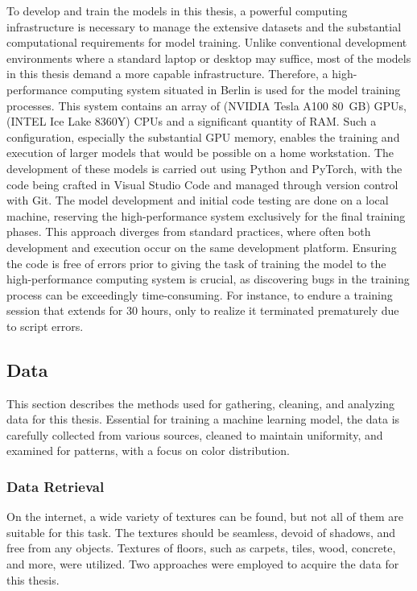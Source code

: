 To develop and train the models in this thesis, a powerful computing infrastructure is necessary to manage the extensive datasets and the substantial computational requirements for model training. Unlike conventional development environments where a standard laptop or desktop may suffice, most of the models in this thesis demand a more capable infrastructure. Therefore, a high-performance computing system situated in Berlin is used for the model training processes. This system contains an array of (NVIDIA Tesla A100 80 GB) GPUs, (INTEL Ice Lake 8360Y) CPUs and a significant quantity of RAM. Such a configuration, especially the substantial GPU memory, enables the training and execution of larger models that would be possible on a home workstation. The development of these models is carried out using Python and PyTorch, with the code being crafted in Visual Studio Code and managed through version control with Git. The model development and initial code testing are done on a local machine, reserving the high-performance system exclusively for the final training phases. This approach diverges from standard practices, where often both development and execution occur on the same development platform. Ensuring the code is free of errors prior to giving the task of training the model to the high-performance computing system is crucial, as discovering bugs in the training process can be exceedingly time-consuming. For instance, to endure a training session that extends for 30 hours, only to realize it terminated prematurely due to script errors.

\subsection{Data}
    
This section describes the methods used for gathering, cleaning, and analyzing data for this thesis. Essential for training a machine learning model, the data is carefully collected from various sources, cleaned to maintain uniformity, and examined for patterns, with a focus on color distribution.


\subsubsection{Data Retrieval}
On the internet, a wide variety of textures can be found, but not all of them are suitable for this task. The textures should be seamless, devoid of shadows, and free from any objects. Textures of floors, such as carpets, tiles, wood, concrete, and more, were utilized. Two approaches were employed to acquire the data for this thesis.

